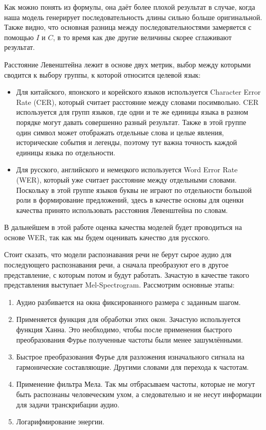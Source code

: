 Как можно понять из формулы, она даёт более плохой результат в случае, когда наша модель генерирует последовательность длины сильно больше оригинальной.
Также видно, что основная разница между последовательностями замеряется с помощью $I$ и $C$, в то время как две другие величины скорее сглаживают результат.


Расстояние Левенштейна лежит в основе двух метрик, выбор между которыми сводится к выбору группы, к которой относится целевой язык:
\begin{itemize}
  \item Для китайского, японского и корейского языков используется Character Error Rate (CER), который считает расстояние между словами посимвольно.
  CER используется для групп языков, где одни и те же единицы языка в разном порядке могут давать совершенно разный результат.
  Также в этой группе один символ может отображать отдельные слова и целые явления, исторические события и легенды, поэтому тут важна точность каждой единицы языка по отдельности.
  \item Для русского, английского и немецкого используется Word Error Rate (WER), который уже считает расстояние между отдельными словами.
  Поскольку в этой группе языков буквы не играют по отдельности большой роли в формирование предложений, здесь в качестве основы для оценки качества принято использовать расстояния Левенштейна по словам.
\end{itemize}

В дальнейшем в этой работе оценка качества моделей будет проводиться на основе WER, так как мы будем оценивать качество для русского.


Стоит сказать, что модели распознавания речи не берут сырое аудио для последующего распознавания речи, а сначала преобразуют его в другое представление, с которым потом и будут работать.
Зачастую в качестве такого представления выступает Mel-Spectrogram.
Рассмотрим основные этапы:
\begin{enumerate}
  \item Аудио разбивается на окна фиксированного размера с заданным шагом.
  \item Применяется функция для обработки этих окон.
  Зачастую используется функция Ханна.
  Это необходимо, чтобы после применения быстрого преобразования Фурье полученные частоты были менее зашумлёнными.
  \item Быстрое преобразования Фурье для разложения изначального сигнала на гармонические составляющие.
  Другими словами для перехода к частотам.
  \item Применение фильтра Мела.
  Так мы отбрасываем частоты, которые не могут быть распознаны человеческим ухом, а следовательно и не несут информации для задачи транскрибации аудио.
  \item Логарифмирование энергии.
\end{enumerate}

